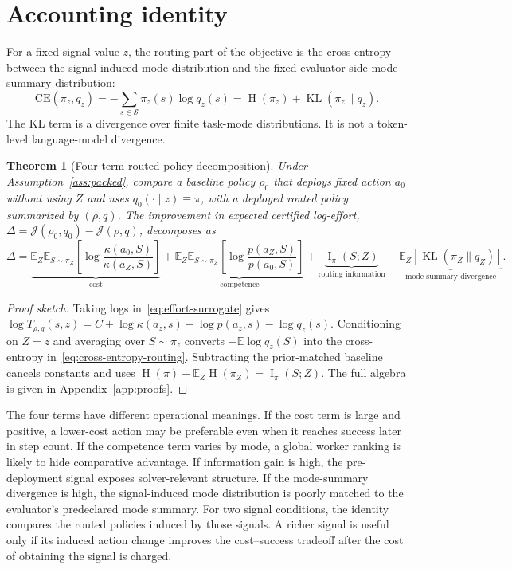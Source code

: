 \documentclass{article}
\newtheorem{theorem}{Theorem}
\DeclareMathOperator{\KL}{KL}
\DeclareMathOperator{\MI}{I}
\DeclareMathOperator{\Hent}{H}
\newcommand{\cS}{\mathcal{S}}
\newcommand{\E}{\mathbb{E}}
\newcommand{\J}{\mathcal{J}}
\begin{document}
\section{Accounting identity}
\label{sec:accounting}

For a fixed signal value $z$, the routing part of the objective is the cross-entropy between the signal-induced mode distribution and the fixed evaluator-side mode-summary distribution:
\begin{equation}
  \mathrm{CE}(\pi_z,q_z)
  =
  -\sum_{s\in\cS}\pi_z(s)\log q_z(s)
  =
  \Hent(\pi_z)+\KL(\pi_z\|q_z).
  \label{eq:cross-entropy-routing}
\end{equation}
The KL term is a divergence over finite task-mode distributions.
It is not a token-level language-model divergence.

\begin{theorem}[Four-term routed-policy decomposition]
\label{thm:four-term}
Under Assumption~\ref{ass:packed}, compare a baseline policy $\rho_0$ that deploys fixed action $a_0$ without using $Z$ and uses $q_0(\cdot\mid z)\equiv\pi$, with a deployed routed policy summarized by $(\rho,q)$.
The improvement in expected certified log-effort,
$\Delta=\J(\rho_0,q_0)-\J(\rho,q)$, decomposes as
\begin{equation}
\label{eq:four-term}
  \Delta
  =
  \underbrace{\E_Z\E_{S\sim\pi_Z}\!\left[\log\frac{\kappa(a_0,S)}{\kappa(a_Z,S)}\right]}_{\text{cost}}
  +
  \underbrace{\E_Z\E_{S\sim\pi_Z}\!\left[\log\frac{p(a_Z,S)}{p(a_0,S)}\right]}_{\text{competence}}
  +
  \underbrace{\MI_\pi(S;Z)}_{\text{routing information}}
  -
  \underbrace{\E_{Z}\!\left[\KL(\pi_{Z}\|q_{Z})\right]}_{\text{mode-summary divergence}} .
\end{equation}
\end{theorem}

\begin{proof}[Proof sketch]
Taking logs in~\eqref{eq:effort-surrogate} gives
$\log T_{\rho,q}(s,z)=C+\log\kappa(a_z,s)-\log p(a_z,s)-\log q_z(s)$.
Conditioning on $Z=z$ and averaging over $S\sim\pi_z$ converts
$-\E\log q_z(S)$ into the cross-entropy in~\eqref{eq:cross-entropy-routing}.
Subtracting the prior-matched baseline cancels constants and uses
$\Hent(\pi)-\E_Z\Hent(\pi_Z)=\MI_\pi(S;Z)$.
The full algebra is given in Appendix~\ref{app:proofs}.
\end{proof}

The four terms have different operational meanings.
If the cost term is large and positive, a lower-cost action may be preferable even when it reaches success later in step count.
If the competence term varies by mode, a global worker ranking is likely to hide comparative advantage.
If information gain is high, the pre-deployment signal exposes solver-relevant structure.
If the mode-summary divergence is high, the signal-induced mode distribution is poorly matched to the evaluator's predeclared mode summary.
For two signal conditions, the identity compares the routed policies induced by those signals.
A richer signal is useful only if its induced action change improves the cost--success tradeoff after the cost of obtaining the signal is charged.
\end{document}
